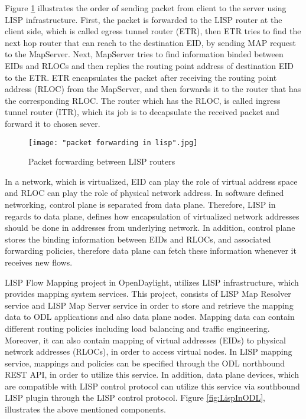\documentclass[english]{tktltiki2}
\theoremstyle{definition}
\theoremstyle{remark}
\begin{document}
{Figure \ref{fig:LispPacketForwarding} illustrates the order of sending packet from client to the server using LISP infrastructure. First, the packet is forwarded to the LISP router at the client side, which is called egress tunnel router (ETR), then ETR tries to find the next hop router that can reach to the destination EID, by sending MAP request to the MapServer. Next, MapServer tries to find information binded between EIDs and RLOCs and then replies the routing point address of destination EID to the ETR. ETR encapsulates the packet after receiving the routing point address (RLOC) from the MapServer, and then forwards it to the router that has the corresponding RLOC. The router which has the RLOC, is called ingress tunnel router (ITR), which its job is to decapsulate the received packet and forward it to chosen sever. \cite{OKH14}


\begin{figure}[h!t]
\centering
{}
\texttt{[image: "packet forwarding in lisp".jpg]}
\caption{Packet forwarding between LISP routers \cite{OKH14}}
\label{fig:LispPacketForwarding}
\end{figure}

In a network, which is virtualized, EID can play the role of virtual address space and RLOC can play the role of physical network address. In software defined networking, control plane is separated from data plane. Therefore, LISP in regards to data plane, defines how encapsulation of virtualized network addresses should be done in addresses from underlying network. In addition, control plane stores the binding information between EIDs and RLOCs, and associated forwarding policies, therefore data plane can fetch these information whenever it receives new flows. \cite{ODLLISP}  

LISP Flow Mapping project in OpenDaylight, utilizes LISP infrastructure, which provides mapping system services. This project, consists of LISP Map Resolver service and LISP Map Server service in order to store and retrieve the mapping data to ODL applications and  also data plane nodes. Mapping data can contain different routing policies including load balancing and traffic engineering. Moreover, it can also contain mapping of virtual addresses (EIDs) to physical network addresses (RLOCs), in order to access virtual nodes. In LISP mapping service, mappings and policies can be specified through the ODL northbound REST API, in order to utilize this service. In addition, data plane devices, which are compatible with LISP control protocol can utilize this service via southbound LISP plugin through the LISP control protocol. Figure \ref{fig:LispInODL}, illustrates the above mentioned components. \cite{ODLLISP}

}
\end{document}
